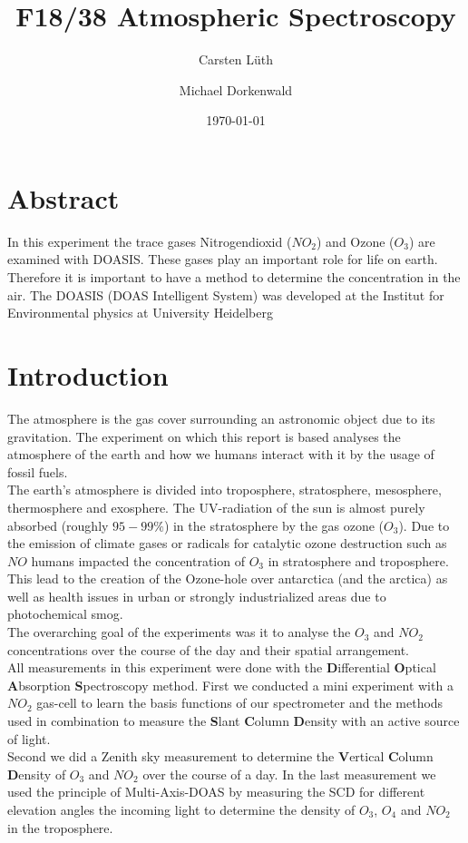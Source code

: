 \documentclass[12pt, english]{scrartcl} %
\title{F18/38 Atmospheric Spectroscopy}
\author{Carsten L{\"u}th \and Michael Dorkenwald}
\date{\today}
\begin{document}
\maketitle

\begin{multicols}{2}


\section{Abstract}
In this experiment the trace gases Nitrogendioxid ($NO_2$) and Ozone ($O_3$) are examined with DOASIS. These gases play an important role for life on earth. Therefore it is important to have a method to determine the concentration in the air. The DOASIS (DOAS Intelligent System) was developed at the Institut for Environmental physics at University Heidelberg
\section{Introduction}
The atmosphere is the gas cover surrounding an astronomic object due to its gravitation. The experiment on which this report is based analyses the atmosphere of the earth and how we humans interact with it by the usage of fossil fuels.\\
The earth's atmosphere is divided into troposphere, stratosphere, mesosphere, thermosphere and exosphere. The UV-radiation of the sun is almost purely absorbed (roughly $95-99\%$) in the stratosphere by the gas ozone ($O_3$). 
Due to the emission of climate gases or radicals for catalytic ozone destruction such as $NO$ humans impacted the concentration of $O_3$ in stratosphere and troposphere.\\  
This lead to the creation of the Ozone-hole over antarctica (and the arctica) as well as health issues in urban or strongly industrialized areas due to photochemical smog.\\
The overarching goal of the experiments was it to analyse the $O_3$ and $NO_2$ concentrations over the course of the day and their spatial arrangement.\\
All measurements in this experiment were done with the \textbf{D}ifferential \textbf{O}ptical \textbf{A}bsorption \textbf{S}pectroscopy method. 
First we conducted a mini experiment with a $NO_2$ gas-cell to learn the basis functions of our spectrometer and the methods used in combination to measure the \textbf{S}lant \textbf{C}olumn \textbf{D}ensity with an active source of light.\\
Second we did a Zenith sky measurement to determine the \textbf{V}ertical \textbf{C}olumn \textbf{D}ensity of $O_3$ and $NO_2$ over the course of a day. 
In the last measurement we used the principle of Multi-Axis-DOAS by measuring the SCD for different elevation angles the incoming light to determine the density of $O_3$, $O_4$ and $NO_2$ in the troposphere.\\

\end{multicols}
\end{document}

